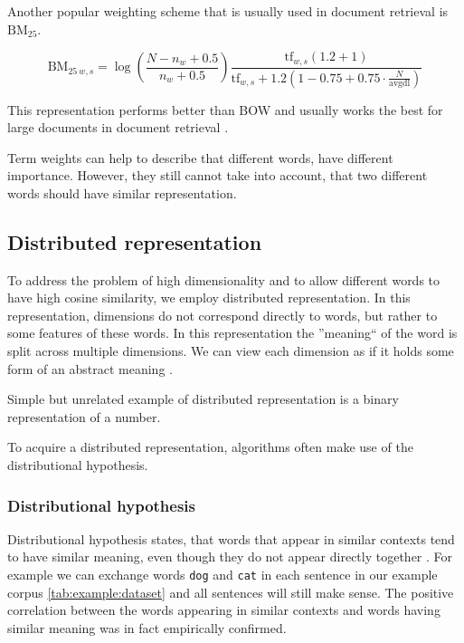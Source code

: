     Another popular weighting scheme that is usually used in document retrieval is $\mathrm{BM_{25}}$. 
    
    $$\mathrm{BM}_{25~w,s} = \log \left(\frac{N-n_w+0.5}{n_w + 0.5}\right)    \frac{\mathrm{tf}_{w,s} (1.2 + 1)}{\mathrm{tf}_{w,s} + 1.2  \left(1 - 0.75 + 0.75 \cdot \frac{N}{\text{avgdl}}\right)}$$
    
    This representation performs better than BOW and usually works the best for large documents in document retrieval \cite{li2014semantic}.
    
    Term weights can help to describe that different words, have different importance.
    However, they still cannot take into account, that two different words should have similar representation.
    
    
    \subsection{Distributed representation}
    
    To address the problem of high dimensionality and to allow different words to have high cosine similarity, we employ distributed representation.
    In this representation, dimensions do not correspond directly to words, but rather to some features of these words.
    In this representation the ''meaning`` of the word is split across multiple dimensions.
    We can view each dimension as if it holds some form of an abstract meaning \cite{le2014distributed}. 
    
    Simple but unrelated example of distributed representation is a binary representation of a number.
    
    To acquire a distributed representation, algorithms often make use of the distributional hypothesis.

    \subsubsection{Distributional hypothesis}
    
    Distributional hypothesis states, that words that appear in similar contexts tend to have similar meaning,
    even though they do not appear directly together \cite{harris1954distributional} \cite{Rubenstein:1965:CCS:365628.365657}. %
    For example we can exchange words \texttt{dog} and \texttt{cat} in each sentence in our example corpus \ref{tab:example:dataset}
    and all sentences will still make sense. 
    The positive correlation between the words appearing in similar contexts and words having similar meaning was in fact empirically confirmed.
    
